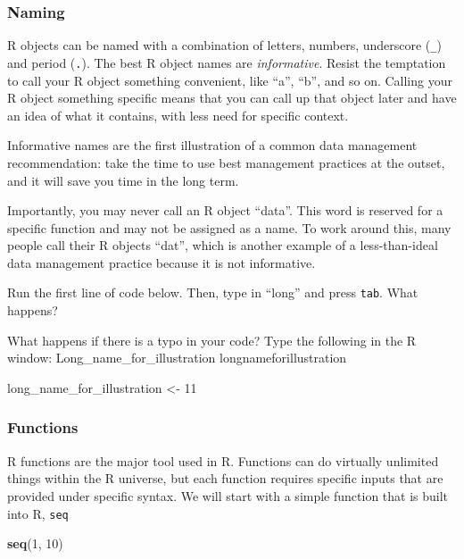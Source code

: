 \documentclass[]{article}
\newenvironment{Shaded}{\begin{snugshade}}{\end{snugshade}}
\newcommand{\KeywordTok}[1]{\textcolor[rgb]{0.13,0.29,0.53}{\textbf{#1}}}
\newcommand{\DecValTok}[1]{\textcolor[rgb]{0.00,0.00,0.81}{#1}}
\newcommand{\StringTok}[1]{\textcolor[rgb]{0.31,0.60,0.02}{#1}}
\newcommand{\NormalTok}[1]{#1}
\begin{document}
\subsubsection{Naming}\label{naming}

R objects can be named with a combination of letters, numbers,
underscore (\texttt{\_}) and period (\texttt{.}). The best R object
names are \emph{informative}. Resist the temptation to call your R
object something convenient, like ``a'', ``b'', and so on. Calling your
R object something specific means that you can call up that object later
and have an idea of what it contains, with less need for specific
context.

Informative names are the first illustration of a common data management
recommendation: take the time to use best management practices at the
outset, and it will save you time in the long term.

Importantly, you may never call an R object ``data''. This word is
reserved for a specific function and may not be assigned as a name. To
work around this, many people call their R objects ``dat'', which is
another example of a less-than-ideal data management practice because it
is not informative.

Run the first line of code below. Then, type in ``long'' and press
\texttt{tab}. What happens?

What happens if there is a typo in your code? Type the following in the
R window: Long\_name\_for\_illustration longnameforillustration

\begin{Shaded}
\begin{Highlighting}[]
\NormalTok{long_name_for_illustration <-}\StringTok{ }\DecValTok{11}
\end{Highlighting}
\end{Shaded}

\subsubsection{Functions}\label{functions}

R functions are the major tool used in R. Functions can do virtually
unlimited things within the R universe, but each function requires
specific inputs that are provided under specific syntax. We will start
with a simple function that is built into R, \texttt{seq}

\begin{Shaded}
\begin{Highlighting}[]
\KeywordTok{seq}\NormalTok{(}\DecValTok{1}\NormalTok{, }\DecValTok{10}\NormalTok{)}
\end{Highlighting}
\end{Shaded}
\end{document}
